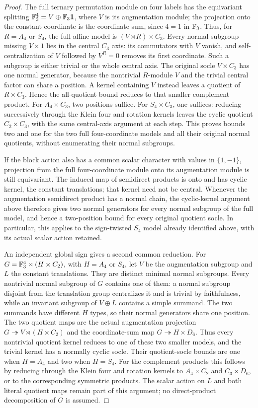 \begin{proof}
The full ternary permutation module on four labels has the equivariant
splitting $\mathbb F_3^4=V\oplus\mathbb F_3\mathbf{1}$, where $V$ is its augmentation
module; the projection onto the constant coordinate is the coordinate
sum, since $4=1$ in $\mathbb F_3$. Thus, for $R=A_4$ or $S_4$, the full affine
model is $(V\rtimes R)\times C_3$. Every normal subgroup missing
$V\times1$ lies in the central $C_3$ axis: its commutators with $V$ vanish,
and self-centralization of $V$ followed by $V^R=0$ removes its first
coordinate. Such a subgroup is either trivial or the whole central axis.
The original socle $V\times C_3$ has one normal generator, because the
nontrivial $R$-module $V$ and the trivial central factor can share a
position. A kernel containing $V$ instead leaves a quotient of
$R\times C_3$. Hence the all-quotient bound reduces to that smaller
complement product. For $A_4\times C_3$, two positions suffice. For
$S_4\times C_3$, one suffices: reducing successively through the Klein
four and rotation kernels leaves the cyclic quotient $C_2\times C_3$,
with the same central-axis argument at each step. This proves bounds
two and one for the two full four-coordinate models and all their
original normal quotients, without enumerating their normal subgroups.

If the block action also has a common scalar character with values in
$\{1,-1\}$, projection from the full four-coordinate module onto its
augmentation module is still equivariant. The induced map of semidirect
products is onto and has cyclic kernel, the constant translations;
that kernel need not be central. Whenever the augmentation semidirect
product has a normal chain, the cyclic-kernel argument above therefore
gives two normal generators for every normal subgroup of the full model,
and hence a two-position bound for every original quotient socle.
In particular, this applies to the sign-twisted $S_4$ model already
identified above, with its actual scalar action retained.

An independent global sign gives a second common reduction. For
$G=\mathbb F_3^4\rtimes(H\times C_2)$, with $H=A_4$ or $S_4$, let $V$ be
the augmentation subgroup and $L$ the constant translations. They are
distinct minimal normal subgroups. Every nontrivial normal subgroup of
$G$ contains one of them: a normal subgroup disjoint from the translation
group centralizes it and is trivial by faithfulness, while an invariant
subgroup of $V\oplus L$ contains a simple summand. The two summands have
different $H$ types, so their normal generators share one position.
The two quotient maps are the actual augmentation projection
$G\twoheadrightarrow V\rtimes(H\times C_2)$ and the coordinate-sum map
$G\twoheadrightarrow H\times D_6$. Thus every nontrivial quotient kernel
reduces to one of these two smaller models, and the trivial kernel has
a normally cyclic socle. Their quotient-socle bounds are one when
$H=A_4$ and two when $H=S_4$. For the complement products this follows
by reducing through the Klein four and rotation kernels to
$A_4\times C_2$ and $C_3\times D_6$, or to the corresponding symmetric
products. The scalar action on $L$ and both literal quotient maps remain
part of this argument; no direct-product decomposition of $G$ is assumed.


\end{proof}
